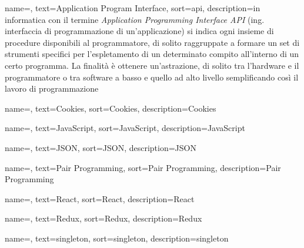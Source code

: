 
\renewcommand{\acronymname}{Acronimi e abbreviazioni}




{
    name=,
    text=Application Program Interface,
    sort=api,
    description={in informatica con il termine \emph{Application Programming Interface API} (ing. interfaccia di programmazione di un'applicazione) si indica ogni insieme di procedure disponibili al programmatore, di solito raggruppate a formare un set di strumenti specifici per l'espletamento di un determinato compito all'interno di un certo programma. La finalità è ottenere un'astrazione, di solito tra l'hardware e il programmatore o tra software a basso e quello ad alto livello semplificando così il lavoro di programmazione}
}

{
    name=,
    text=Cookies,
    sort=Cookies,
    description={Cookies}
}

{
    name=,
    text=JavaScript,
    sort=JavaScript,
    description={JavaScript}
}

{
    name=,
    text=JSON,
    sort=JSON,
    description={JSON}
}

{
    name=,
    text=Pair Programming,
    sort=Pair Programming,
    description={Pair Programming}
}

{
    name=,
    text=React,
    sort=React,
    description={React}
}

{
    name=,
    text=Redux,
    sort=Redux,
    description={Redux}
}

{
    name=,
    text=singleton,
    sort=singleton,
    description={singleton}
}


